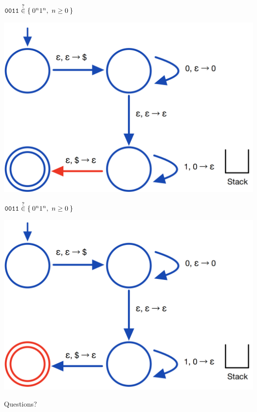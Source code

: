 \documentclass[aspectratio=169]{beamer}
\begin{document}
\begin{frame}{$\texttt{0011} \stackrel{?}{\in} \Set{0^n 1^n,\ n \geq 0}$}
    \begin{center}
        \includegraphics[scale=0.30]{images/pda_comp/PDA_Comp_14.png}
    \end{center}
\end{frame}

\begin{frame}{$\texttt{0011} \stackrel{?}{\in} \Set{0^n 1^n,\ n \geq 0}$}
    \begin{center}
        \includegraphics[scale=0.30]{images/pda_comp/PDA_Comp_15.png}
    \end{center}
\end{frame}

\begin{frame}{}
    \begin{center}
        {\color{sigma@mainblue} \LARGE Questions?}
    \end{center}
\end{frame}
\end{document}
